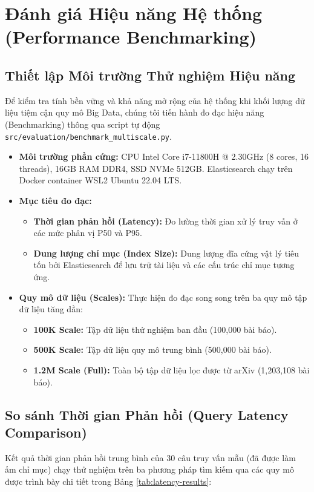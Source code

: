 \chapter{Đánh giá Hiệu năng Hệ thống (Performance Benchmarking)}
\label{ch:benchmarking}

\section{Thiết lập Môi trường Thử nghiệm Hiệu năng}
Để kiểm tra tính bền vững và khả năng mở rộng của hệ thống khi khối lượng dữ liệu tiệm cận quy mô Big Data, chúng tôi tiến hành đo đạc hiệu năng (Benchmarking) thông qua script tự động \texttt{src/evaluation/benchmark\_multiscale.py}.
\begin{itemize}
    \item \textbf{Môi trường phần cứng:} CPU Intel Core i7-11800H @ 2.30GHz (8 cores, 16 threads), 16GB RAM DDR4, SSD NVMe 512GB. Elasticsearch chạy trên Docker container WSL2 Ubuntu 22.04 LTS.
    \item \textbf{Mục tiêu đo đạc:}
      \begin{itemize}
          \item \textbf{Thời gian phản hồi (Latency):} Đo lường thời gian xử lý truy vấn ở các mức phân vị P50 và P95.
          \item \textbf{Dung lượng chỉ mục (Index Size):} Dung lượng đĩa cứng vật lý tiêu tốn bởi Elasticsearch để lưu trữ tài liệu và các cấu trúc chỉ mục tương ứng.
      \end{itemize}
    \item \textbf{Quy mô dữ liệu (Scales):} Thực hiện đo đạc song song trên ba quy mô tập dữ liệu tăng dần:
      \begin{itemize}
          \item \textbf{100K Scale:} Tập dữ liệu thử nghiệm ban đầu (100,000 bài báo).
          \item \textbf{500K Scale:} Tập dữ liệu quy mô trung bình (500,000 bài báo).
          \item \textbf{1.2M Scale (Full):} Toàn bộ tập dữ liệu lọc được từ arXiv (1,203,108 bài báo).
      \end{itemize}
\end{itemize}

\section{So sánh Thời gian Phản hồi (Query Latency Comparison)}
Kết quả thời gian phản hồi trung bình của 30 câu truy vấn mẫu (đã được làm ấm chỉ mục) chạy thử nghiệm trên ba phương pháp tìm kiếm qua các quy mô được trình bày chi tiết trong Bảng \ref{tab:latency-results}:

